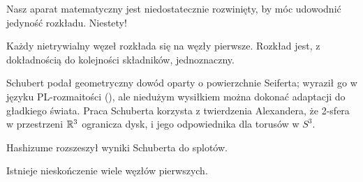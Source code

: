 Nasz aparat matematyczny jest niedostatecznie rozwinięty, by móc udowodnić jedyność rozkładu.
Niestety!

\begin{theorem}[Schubert, 1949]
    Każdy nietrywialny węzeł rozkłada się na węzły pierwsze.
    Rozkład jest, z dokładnością do kolejności składników, jednoznaczny.
%
\end{theorem}

Schubert podał geometryczny dowód oparty o powierzchnie Seiferta; wyraził go w języku PL-rozmaitości (\cite{schubert1949}), ale niedużym wysiłkiem można dokonać adaptacji do gładkiego świata.
%
Praca Schuberta korzysta z twierdzenia Alexandera, że 2-sfera w przestrzeni $\mathbb R^3$ ogranicza dysk, i jego odpowiednika dla torusów w $S^3$.

Hashizume \cite{hashizume1958} rozszeszył wyniki Schuberta do splotów.
%

\begin{proposition}
\label{prp:infinitely_many_prime_knots}%
    Istnieje nieskończenie wiele węzłów pierwszych.
\end{proposition}

